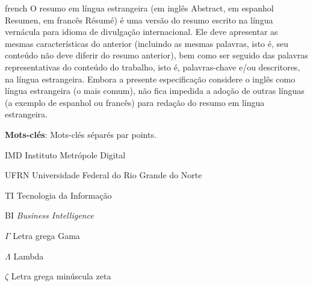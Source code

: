 \documentclass[
    12pt,				%
	oneside,            %
	a4paper,			%
	english,			%
	french,
	spanish,
	brazil				%
	]{abntex2}
\newcommand{\listofquadrosname}{Lista de quadros}
\begin{document}
\begin{resumo}[Résumé]
\vspace{\onelineskip}
\begin{otherlanguage*}{french}
O resumo em língua estrangeira (em inglês Abstract, em espanhol Resumen, em francês Résumé) é uma versão do resumo escrito na língua vernácula para idioma de divulgação internacional. Ele deve apresentar as mesmas características do anterior (incluindo as mesmas palavras, isto é, seu conteúdo não deve diferir do resumo anterior), bem como ser seguido das palavras representativas do conteúdo do trabalho, isto é, palavras-chave e/ou descritores, na língua estrangeira. Embora a presente especificação considere o inglês como língua estrangeira (o mais comum), não fica impedida a adoção de outras línguas (a exemplo de espanhol ou francês) para redação do resumo em língua estrangeira.

\noindent\textbf{Mots-clés}: Mots-clés séparés par points.
\end{otherlanguage*}
\end{resumo}

\listoffigures*
\clearpage

\pdfbookmark[0]{\listofquadrosname}{loq}
\listofquadros*
\clearpage

\listoftables*
\clearpage

\begin{siglas}
  \item[IMD] Instituto Metrópole Digital
  \item[UFRN] Universidade Federal do Rio Grande do Norte
  \item[TI] Tecnologia da Informação
  \item[BI] \textit{Business Intelligence}
  
\end{siglas}

\begin{simbolos}
  \item[$\Gamma$] Letra grega Gama
  \item[$\Lambda$] Lambda
  \item[$\zeta$] Letra grega minúscula zeta
\end{simbolos}

\tableofcontents*
\clearpage


\textual



\postextual



\begin{anexosenv}
	
\end{anexosenv}
\end{document}
